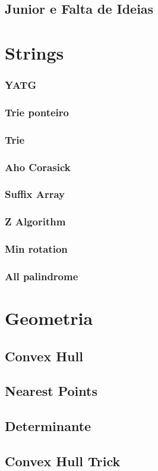 \documentclass[a4paper,12pt]{article}
\newcommand\includes[4]{
   \subsection{#2}
   
}
\newcommand\includess[4]{
   \subsubsection{#2}
   
}
\begin{document}
\begin{multicols}{2}
\includes{c++}{Junior e Falta de Ideias}{graph}{centroid_decomp.cpp}

\section{Strings}
\includess{c++}{YATG}{strings}{YATG.cpp}
\includess{c++}{Trie ponteiro}{strings}{trie_ponteiro.cpp}
\includess{c++}{Trie}{strings}{trieXor.cpp}
\includess{c++}{Aho Corasick}{strings}{aho-corasick.cpp}
\includess{c++}{Suffix Array}{strings}{suffix_array.cpp}
\includess{c++}{Z Algorithm}{strings}{z_algo.cpp}
\includess{c++}{Min rotation}{strings}{min_rot.cpp}
\includess{c++}{All palindrome}{strings}{all_palindrome.cpp}

\section{Geometria}
\includes{c++}{Convex Hull}{geometria}{convexhull.cpp}
\includes{c++}{Nearest Points}{geometria}{near.cpp}
\includes{c++}{Determinante}{geometria}{det.cpp}
\includes{c++}{Convex Hull Trick}{adhoc}{cht.cpp}


\end{multicols}
\end{document}
